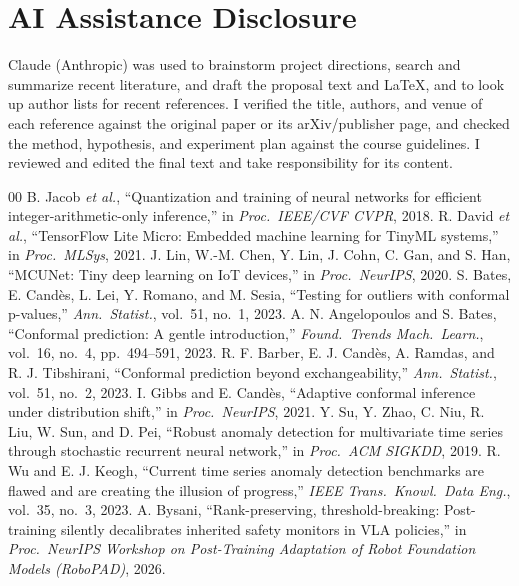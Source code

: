 \documentclass[conference]{IEEEtran}
\begin{document}
\section*{AI Assistance Disclosure}
Claude (Anthropic) was used to brainstorm project directions, search and summarize recent literature, and draft the proposal text and LaTeX, and to look up author lists for recent references. I verified the title, authors, and venue of each reference against the original paper or its arXiv/publisher page, and checked the method, hypothesis, and experiment plan against the course guidelines. I reviewed and edited the final text and take responsibility for its content.

\balance
\begin{thebibliography}{00}
 B. Jacob \textit{et al.}, ``Quantization and training of neural networks for efficient integer-arithmetic-only inference,'' in \textit{Proc.\ IEEE/CVF CVPR}, 2018.
 R. David \textit{et al.}, ``TensorFlow Lite Micro: Embedded machine learning for TinyML systems,'' in \textit{Proc.\ MLSys}, 2021.
 J. Lin, W.-M. Chen, Y. Lin, J. Cohn, C. Gan, and S. Han, ``MCUNet: Tiny deep learning on IoT devices,'' in \textit{Proc.\ NeurIPS}, 2020.
 S. Bates, E. Cand\`es, L. Lei, Y. Romano, and M. Sesia, ``Testing for outliers with conformal p-values,'' \textit{Ann.\ Statist.}, vol.~51, no.~1, 2023.
 A. N. Angelopoulos and S. Bates, ``Conformal prediction: A gentle introduction,'' \textit{Found.\ Trends Mach.\ Learn.}, vol.~16, no.~4, pp.~494--591, 2023.
 R. F. Barber, E. J. Cand\`es, A. Ramdas, and R. J. Tibshirani, ``Conformal prediction beyond exchangeability,'' \textit{Ann.\ Statist.}, vol.~51, no.~2, 2023.
 I. Gibbs and E. Cand\`es, ``Adaptive conformal inference under distribution shift,'' in \textit{Proc.\ NeurIPS}, 2021.
 Y. Su, Y. Zhao, C. Niu, R. Liu, W. Sun, and D. Pei, ``Robust anomaly detection for multivariate time series through stochastic recurrent neural network,'' in \textit{Proc.\ ACM SIGKDD}, 2019.
 R. Wu and E. J. Keogh, ``Current time series anomaly detection benchmarks are flawed and are creating the illusion of progress,'' \textit{IEEE Trans.\ Knowl.\ Data Eng.}, vol.~35, no.~3, 2023.
 A. Bysani, ``Rank-preserving, threshold-breaking: Post-training silently decalibrates inherited safety monitors in VLA policies,'' in \textit{Proc.\ NeurIPS Workshop on Post-Training Adaptation of Robot Foundation Models (RoboPAD)}, 2026.

\end{thebibliography}
\end{document}
